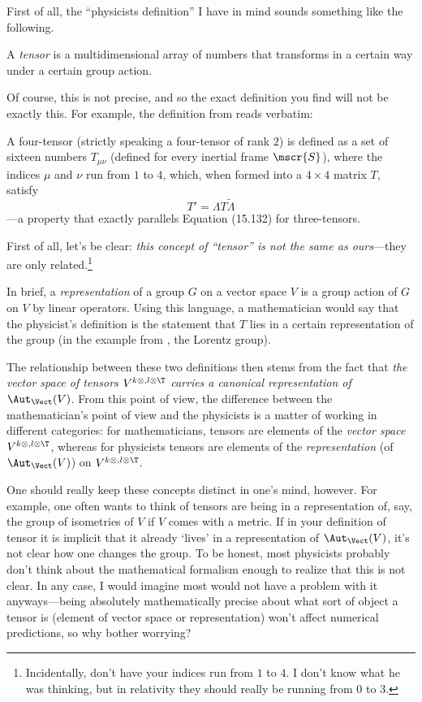 First of all, the ``physicists definition'' I have in mind sounds something like the following.
\begin{displayquote}
	A \emph{tensor} is a multidimensional array of numbers that transforms in a certain way under a certain group action.
\end{displayquote}
Of course, this is not precise, and so the exact definition you find will not be exactly this.  For example, the definition from \cite[pg.~659]{Taylor} reads verbatim:
\begin{displayquote}
	A four-tensor (strictly speaking a four-tensor of rank $2$) is defined as a set of sixteen numbers $T_{\mu \nu}$ (defined for every inertial frame $\mscr{S}$), where the indices $\mu$ and $\nu$ run from $1$ to $4$, which, when formed into a $4\times 4$ matrix $T$, satisfy
	\begin{equation*}
		T'=\Lambda T\tilde{\Lambda}\tag{15.137}
	\end{equation*}
	---a property that exactly parallels Equation (15.132) for three-tensors.
\end{displayquote}
First of all, let's be clear:  \emph{this concept of ``tensor'' is \emph{not} the same as ours}---they are only related.\footnote{Incidentally, don't have your indices run from $1$ to $4$.  I don't know what he was thinking, but in relativity they should really be running from $0$ to $3$.}

In brief, a \emph{representation} of a group $G$ on a vector space $V$ is a group action of $G$ on $V$ by linear operators.  Using this language, a mathematician would say that the physicist's definition is the statement that $T$ lies in a certain representation of the group (in the example from \cite{Taylor}, the Lorentz group).

The relationship between these two definitions then stems from the fact that \emph{the vector space of tensors $V^{k\otimes ,l\otimes \T}$ carries a canonical representation of $\Aut _{\Vect}(V)$}.  From this point of view, the difference between the mathematician's point of view and the physicists is a matter of working in different categories:  for mathematicians, tensors are elements of the \emph{vector space} $V^{k\otimes ,l\otimes \T}$, whereas for physicists tensors are elements of the \emph{representation} (of $\Aut _{\Vect}(V)$) on $V^{k\otimes ,l\otimes \T}$.

One should really keep these concepts distinct in one's mind, however.  For example, one often wants to think of tensors are being in a representation of, say, the group of isometries of $V$ if $V$ comes with a metric.  If in your definition of tensor it is implicit that it already `lives' in a representation of $\Aut _{\Vect}(V)$, it's not clear how one changes the group.  To be honest, most physicists probably don't think about the mathematical formalism enough to realize that this is not clear.  In any case, I would imagine most would not have a problem with it anyways---being absolutely mathematically precise about what sort of object a tensor is (element of vector space or representation) won't affect numerical predictions, so why bother worrying?

